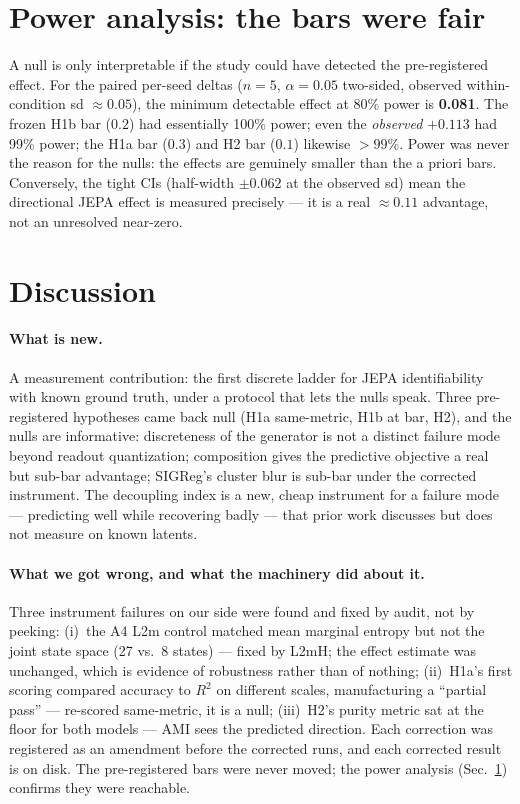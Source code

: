 \documentclass[10pt]{article}
\begin{document}
\section{Power analysis: the bars were fair}
\label{sec:power}
A null is only interpretable if the study could have detected the pre-registered
effect. For the paired per-seed deltas ($n{=}5$, $\alpha{=}0.05$ two-sided,
observed within-condition sd ${\approx}0.05$), the minimum detectable effect at
80\% power is \textbf{0.081}. The frozen H1b bar ($0.2$) had essentially 100\%
power; even the \emph{observed} $+0.113$ had 99\% power; the H1a bar ($0.3$)
and H2 bar ($0.1$) likewise $>99$\%. Power was never the reason for the nulls:
the effects are genuinely smaller than the a priori bars. Conversely, the tight
CIs (half-width ${\pm}0.062$ at the observed sd) mean the directional JEPA
effect is measured precisely --- it is a real $\approx0.11$ advantage, not an
unresolved near-zero.

\section{Discussion}
\label{sec:discussion}
\paragraph{What is new.}
A measurement contribution: the first discrete ladder for JEPA identifiability
with known ground truth, under a protocol that lets the nulls speak. Three
pre-registered hypotheses came back null (H1a same-metric, H1b at bar, H2),
and the nulls are informative: discreteness of the generator is not a distinct
failure mode beyond readout quantization; composition gives the predictive
objective a real but sub-bar advantage; SIGReg's cluster blur is sub-bar under
the corrected instrument. The decoupling index is a new, cheap instrument for
a failure mode --- predicting well while recovering badly --- that prior work
discusses but does not measure on known latents.

\paragraph{What we got wrong, and what the machinery did about it.}
Three instrument failures on our side were found and fixed by audit, not by
peeking: (i)~the A4 L2m control matched mean marginal entropy but not the joint
state space (27 vs.\ 8 states) --- fixed by L2mH; the effect estimate was
unchanged, which is evidence of robustness rather than of nothing;
(ii)~H1a's first scoring compared accuracy to $R^2$ on different scales,
manufacturing a ``partial pass'' --- re-scored same-metric, it is a null;
(iii)~H2's purity metric sat at the floor for both models --- AMI sees the
predicted direction. Each correction was registered as an amendment before the
corrected runs, and each corrected result is on disk. The pre-registered bars
were never moved; the power analysis (Sec.~\ref{sec:power}) confirms they were
reachable.
\end{document}
